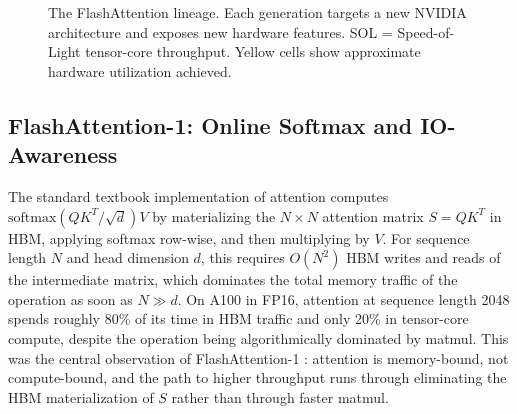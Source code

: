 \documentclass[10pt]{article}
\begin{document}
\begin{figure}[htbp]
\caption{The FlashAttention lineage. Each generation targets a new NVIDIA architecture and exposes new hardware features. SOL = Speed-of-Light tensor-core throughput. Yellow cells show approximate hardware utilization achieved.}
\label{fig:fa-taxonomy}
\end{figure}

\clearpage

\subsection{FlashAttention-1: Online Softmax and IO-Awareness}
\label{sec:fa1}

The standard textbook implementation of attention computes $\mathrm{softmax}(QK^T / \sqrt{d}) V$ by materializing the $N \times N$ attention matrix $S = QK^T$ in HBM, applying softmax row-wise, and then multiplying by $V$. For sequence length $N$ and head dimension $d$, this requires $O(N^2)$ HBM writes and reads of the intermediate matrix, which dominates the total memory traffic of the operation as soon as $N \gg d$. On A100 in FP16, attention at sequence length 2048 spends roughly 80\% of its time in HBM traffic and only 20\% in tensor-core compute, despite the operation being algorithmically dominated by matmul. This was the central observation of FlashAttention-1 \citep{dao2022flashattention}: attention is memory-bound, not compute-bound, and the path to higher throughput runs through eliminating the HBM materialization of $S$ rather than through faster matmul.
\end{document}

